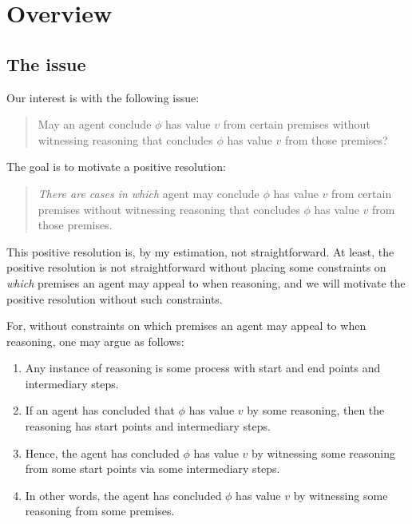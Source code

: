 \chapter{Overview}
\label{cha:overview}

\section{The issue}
\label{sec:issue}

\begin{note}
  Our interest is with the following issue:

  \begin{quote}
    May an agent conclude \(\phi\) has value \(v\) from certain premises without witnessing reasoning that concludes \(\phi\) has value \(v\) from those premises?
  \end{quote}

  The goal is to motivate a positive resolution:

  \begin{quote}
    \emph{There are cases in which} agent may conclude \(\phi\) has value \(v\) from certain premises without witnessing reasoning that concludes \(\phi\) has value \(v\) from those premises.
  \end{quote}

  This positive resolution is, by my estimation, not straightforward.
  At least, the positive resolution is not straightforward without placing some constraints on \emph{which} premises an agent may appeal to when reasoning, and we will motivate the positive resolution without such constraints.

  For, without constraints on which premises an agent may appeal to when reasoning, one may argue as follows:
  \begin{enumerate}
  \item Any instance of reasoning is some process with start and end points and intermediary steps.
  \item If an agent has concluded that \(\phi\) has value \(v\) by some reasoning, then the reasoning has start points and intermediary steps.
  \item Hence, the agent has concluded \(\phi\) has value \(v\) by witnessing some reasoning from some start points via some intermediary steps.
  \item In other words, the agent has concluded \(\phi\) has value \(v\) by witnessing some reasoning from some premises.
  \end{enumerate}


\end{note}
